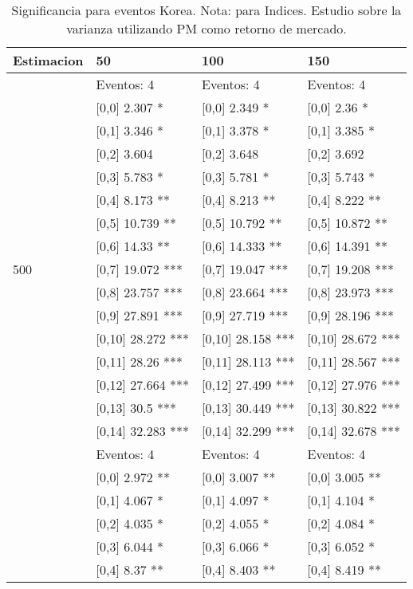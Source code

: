 \begin{table}

\caption{Significancia para eventos Korea. Nota: para Indices. Estudio sobre la varianza utilizando PM como retorno de mercado.}
\centering
\begin{tabular}[t]{llll}
\toprule
Estimacion & 50 & 100 & 150\\
\midrule
 & Eventos:  4 & Eventos:  4 & Eventos:  4\\
 & {}[0,0] 2.307 * & {}[0,0] 2.349 * & {}[0,0] 2.36 *\\
 & {}[0,1] 3.346 * & {}[0,1] 3.378 * & {}[0,1] 3.385 *\\
 & {}[0,2] 3.604 & {}[0,2] 3.648 & {}[0,2] 3.692\\
 & {}[0,3] 5.783 * & {}[0,3] 5.781 * & {}[0,3] 5.743 *\\
\addlinespace
 & {}[0,4] 8.173 ** & {}[0,4] 8.213 ** & {}[0,4] 8.222 **\\
 & {}[0,5] 10.739 ** & {}[0,5] 10.792 ** & {}[0,5] 10.872 **\\
 & {}[0,6] 14.33 ** & {}[0,6] 14.333 ** & {}[0,6] 14.391 **\\
500 & {}[0,7] 19.072 *** & {}[0,7] 19.047 *** & {}[0,7] 19.208 ***\\
 & {}[0,8] 23.757 *** & {}[0,8] 23.664 *** & {}[0,8] 23.973 ***\\
\addlinespace
 & {}[0,9] 27.891 *** & {}[0,9] 27.719 *** & {}[0,9] 28.196 ***\\
 & {}[0,10] 28.272 *** & {}[0,10] 28.158 *** & {}[0,10] 28.672 ***\\
 & {}[0,11] 28.26 *** & {}[0,11] 28.113 *** & {}[0,11] 28.567 ***\\
 & {}[0,12] 27.664 *** & {}[0,12] 27.499 *** & {}[0,12] 27.976 ***\\
 & {}[0,13] 30.5 *** & {}[0,13] 30.449 *** & {}[0,13] 30.822 ***\\
\addlinespace
 & {}[0,14] 32.283 *** & {}[0,14] 32.299 *** & {}[0,14] 32.678 ***\\
 & Eventos:  4 & Eventos:  4 & Eventos:  4\\
 & {}[0,0] 2.972 ** & {}[0,0] 3.007 ** & {}[0,0] 3.005 **\\
 & {}[0,1] 4.067 * & {}[0,1] 4.097 * & {}[0,1] 4.104 *\\
 & {}[0,2] 4.035 * & {}[0,2] 4.055 * & {}[0,2] 4.084 *\\
\addlinespace
 & {}[0,3] 6.044 * & {}[0,3] 6.066 * & {}[0,3] 6.052 *\\
 & {}[0,4] 8.37 ** & {}[0,4] 8.403 ** & {}[0,4] 8.419 **\\

\end{tabular}
\end{table}
